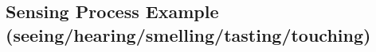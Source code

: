 \documentclass[a4paper, 12pt]{article}
\begin{document}
\pagestyle{empty}

\makeatletter
{}
\makeatother

\graphicspath{{../}}

\subsection*{Sensing Process Example (seeing/hearing/smelling/tasting/touching)}

\begin{center}

\end{center}

\setlength{\tabcolsep}{0mm}
\renewcommand{\arraystretch}{1.1}

\noindent \begin{tabular}{P{\textwidth-()} | C{\dimexpr.12\textwidth-()}  C{\dimexpr.12\textwidth-()}  C{\textwidth-()}  C{\textwidth-()}  C{\textwidth-()}  C{\textwidth-()}  C{\textwidth-()}  C{\textwidth-()}}
\toprule


\end{tabular}
\end{document}
